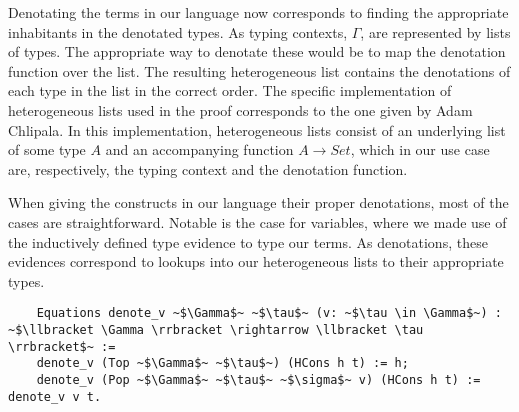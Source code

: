   Denotating the terms in our language now corresponds to finding the appropriate inhabitants in the denotated types.
  As typing contexts, $\Gamma$, are represented by lists of types.
  The appropriate way to denotate these would be to map the denotation function over the list.
  The resulting heterogeneous list contains the denotations of each type in the list in the correct order.
  The specific implementation of heterogeneous lists used in the proof corresponds to the one given by Adam Chlipala\cite{ChlipalaCPDT}.
  In this implementation, heterogeneous lists consist of an underlying list of some type $A$ and an accompanying function $A \rightarrow Set$, which in our use case are, respectively, the typing context and the denotation function.

  When giving the constructs in our language their proper denotations, most of the cases are straightforward.
  Notable is the case for variables, where we made use of the inductively defined type evidence to type our terms.
  As denotations, these evidences correspond to lookups into our heterogeneous lists to their appropriate types.

  \begin{verbatim}
    Equations denote_v ~$\Gamma$~ ~$\tau$~ (v: ~$\tau \in \Gamma$~) : ~$\llbracket \Gamma \rrbracket \rightarrow \llbracket \tau \rrbracket$~ :=
    denote_v (Top ~$\Gamma$~ ~$\tau$~) (HCons h t) := h;
    denote_v (Pop ~$\Gamma$~ ~$\tau$~ ~$\sigma$~ v) (HCons h t) := denote_v v t.
  \end{verbatim}





